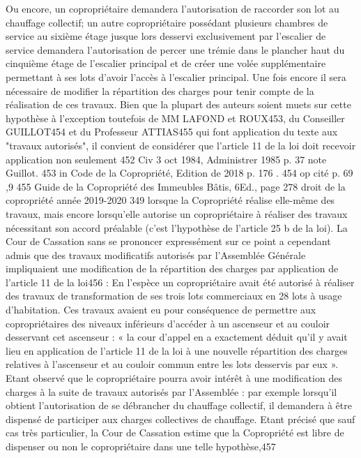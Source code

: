 Ou encore, un copropriétaire demandera l'autorisation de raccorder son lot au chauffage collectif; un autre copropriétaire possédant plusieurs chambres de service au sixième étage jusque lors desservi exclusivement par l'escalier de service demandera l'autorisation de percer une trémie dans le plancher haut du cinquième étage de l'escalier principal et de créer une volée supplémentaire permettant à ses lots d'avoir l'accès à l'escalier principal.
Une fois encore il sera nécessaire de modifier la répartition des charges pour tenir compte de la réalisation de ces travaux.
Bien que la plupart des auteurs soient muets sur cette hypothèse à l'exception toutefois de MM LAFOND et ROUX453, du Conseiller GUILLOT454 et du Professeur ATTIAS455 qui font application du texte aux "travaux autorisés", il convient de considérer que l'article 11 de la loi doit recevoir application non seulement
452 Civ 3 oct 1984, Administrer 1985 p. 37 note Guillot.
453 in Code de la Copropriété, Edition de 2018 p. 176 .
454 op cité p. 69 ,9
455 Guide de la Copropriété des Immeubles Bâtis, 6\degres Ed., page 278 
droit de la copropriété année 2019-2020
349
lorsque la Copropriété réalise elle-même des travaux, mais encore lorsqu'elle autorise un copropriétaire à réaliser des travaux nécessitant son accord préalable (c'est l'hypothèse de l'article 25 b de la loi).
La Cour de Cassation sans se prononcer expressément sur ce point a cependant admis que des travaux modificatifs autorisés par l’Assemblée Générale impliquaient une modification de la répartition des charges par application de l’article 11 de la loi456 :
En l’espèce un copropriétaire avait été autorisé à réaliser des travaux de transformation de ses trois lots commerciaux en 28 lots à usage d’habitation. Ces travaux avaient eu pour conséquence de permettre aux copropriétaires des niveaux inférieurs d’accéder à un ascenseur et au couloir desservant cet ascenseur : « la cour d’appel en a exactement déduit qu’il y avait lieu en application de l’article 11 de la loi à une nouvelle répartition des charges relatives à l’ascenseur et au couloir commun entre les lots desservis par eux ».
Etant observé que le copropriétaire pourra avoir intérêt à une modification des charges à la suite de travaux autorisés par l'Assemblée : par exemple lorsqu'il obtient l'autorisation de se débrancher du chauffage collectif, il demandera à être dispensé de participer aux charges collectives de chauffage. Etant précisé que sauf cas très particulier, la Cour de Cassation estime que la Copropriété est libre de dispenser ou non le copropriétaire dans une telle hypothèse,457
